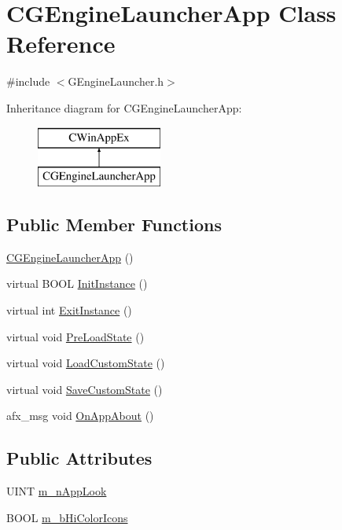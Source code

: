 \hypertarget{class_c_g_engine_launcher_app}{}\section{C\+G\+Engine\+Launcher\+App Class Reference}
\label{class_c_g_engine_launcher_app}


{\ttfamily \#include $<$G\+Engine\+Launcher.\+h$>$}

Inheritance diagram for C\+G\+Engine\+Launcher\+App\+:\begin{figure}[H]
\begin{center}
\leavevmode
\includegraphics[height=2.000000cm]{class_c_g_engine_launcher_app}
\end{center}
\end{figure}
\subsection*{Public Member Functions}
\begin{DoxyCompactItemize}
\item 
\hyperlink{class_c_g_engine_launcher_app_a2e294471310ce4b225c3ddb6e95d8927}{C\+G\+Engine\+Launcher\+App} ()
\item 
virtual B\+O\+O\+L \hyperlink{class_c_g_engine_launcher_app_acaec61d81f1a1ad268f31eea991176b6}{Init\+Instance} ()
\item 
virtual int \hyperlink{class_c_g_engine_launcher_app_a9925ec133627a45a3f49eb2f5e142504}{Exit\+Instance} ()
\item 
virtual void \hyperlink{class_c_g_engine_launcher_app_a41ed00144e7fb895a80b996d63bb15f6}{Pre\+Load\+State} ()
\item 
virtual void \hyperlink{class_c_g_engine_launcher_app_a272ecd686cd450b9e69f87f10a864df4}{Load\+Custom\+State} ()
\item 
virtual void \hyperlink{class_c_g_engine_launcher_app_ab0a40a697fdaf015db6f9880d4c470c3}{Save\+Custom\+State} ()
\item 
afx\+\_\+msg void \hyperlink{class_c_g_engine_launcher_app_a1add2cf343dd3236dfce4e2c157f9015}{On\+App\+About} ()
\end{DoxyCompactItemize}
\subsection*{Public Attributes}
\begin{DoxyCompactItemize}
\item 
U\+I\+N\+T \hyperlink{class_c_g_engine_launcher_app_adcf0224f8eeb538e22cc34c3270ed9a5}{m\+\_\+n\+App\+Look}
\item 
B\+O\+O\+L \hyperlink{class_c_g_engine_launcher_app_a2a79c5e1afe718ed57bc8a550addbf12}{m\+\_\+b\+Hi\+Color\+Icons}
\end{DoxyCompactItemize}



